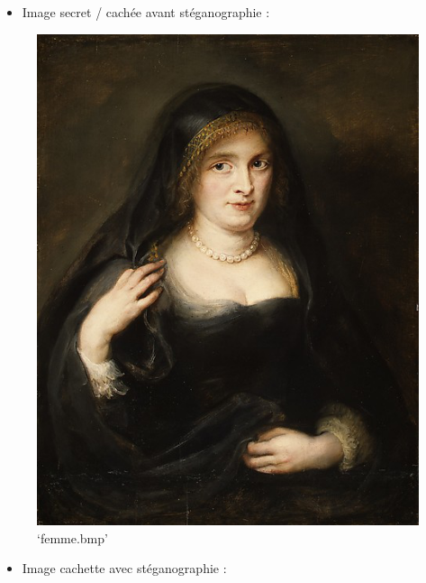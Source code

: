 \documentclass[11pt]{article}
\makeatletter
\def\maxwidth{\ifdim\Gin@nat@width>\linewidth\linewidth
    \else\Gin@nat@width\fi}
\let\Oldincludegraphics\includegraphics
\renewcommand{\includegraphics}[1]{\Oldincludegraphics[width=.8\maxwidth]{#1}}
\providecommand{\tightlist}{%
      \setlength{\itemsep}{0pt}\setlength{\parskip}{0pt}}
\makeatother
\begin{document}
\begin{itemize}
\tightlist
\item
  Image secret / cachée avant stéganographie :
\end{itemize}

\begin{figure}
\centering
\includegraphics{femme.bmp}
\caption{`femme.bmp'}
\end{figure}

\begin{itemize}
\tightlist
\item
  Image cachette avec stéganographie :
\end{itemize}
\end{document}
